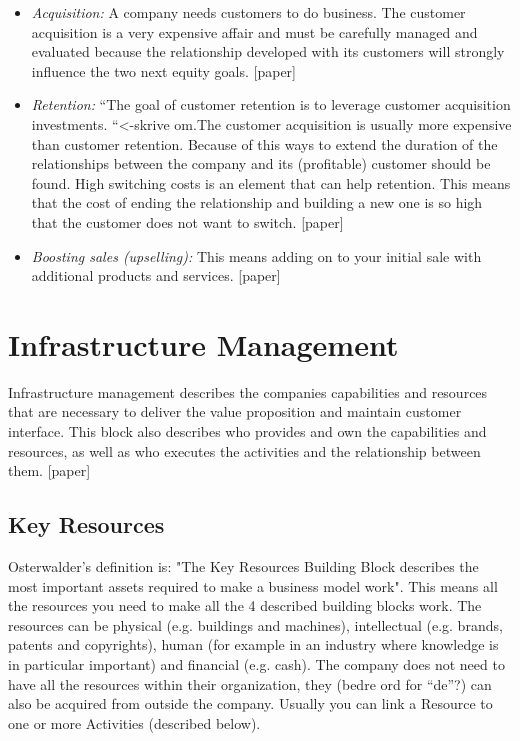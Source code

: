 \begin{itemize}
\renewcommand{\labelitemi}{$\bullet$}
\item \emph{Acquisition:} A company needs customers to do business. The customer acquisition is a very expensive affair and must be carefully managed and evaluated because the relationship developed with its customers will strongly influence the two next equity goals. [paper]
\item \emph{Retention:} “The goal of customer retention is to leverage customer acquisition investments. “<-skrive om.The customer acquisition is usually more expensive than customer retention. Because of this ways to extend the duration of the relationships between the company and its (profitable) customer should be found. High switching costs is an element that can help retention. This means that the cost of ending the relationship and building a new one is so high that the customer does not want to switch. [paper]
\item \emph{Boosting sales (upselling):} This means adding on to your initial sale with additional products and services. 
[paper]
\end{itemize}

\section{Infrastructure Management}
Infrastructure management describes the companies capabilities and resources that are necessary to deliver the value proposition and maintain customer interface. This block also describes who provides and own the capabilities and resources, as well as who executes the activities and the relationship between them. [paper]

\subsection{Key Resources}
Osterwalder's definition is: "The Key Resources Building Block describes the most important assets required to make a business model work". This means all the resources you need to make all the 4 described building blocks work. The resources can be physical (e.g. buildings and machines), intellectual (e.g. brands, patents and copyrights), human (for example in an industry where knowledge is in particular important) and financial (e.g. cash). The company does not need to have all the resources within their organization, they (bedre ord for “de”?) can also be acquired from outside the company. Usually you can link a Resource to one or more Activities (described below).

